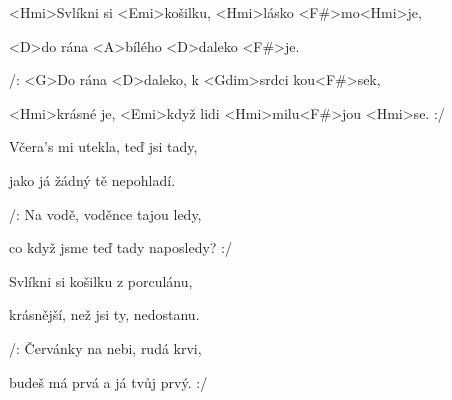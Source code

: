 

\zs
<Hmi>Svlíkni si <Emi>košilku, <Hmi>lásko <F#>mo<Hmi>je,

<D>do rána <A>bílého <D>daleko <F#>je.

/: <G>Do rána <D>daleko, k <Gdim>srdci kou<F#>sek,

<Hmi>krásné je, <Emi>když lidi <Hmi>milu<F#>jou <Hmi>se. :/
\ks

\zs
Včera's mi utekla, teď jsi tady,

jako já žádný tě nepohladí.

/: Na vodě, voděnce tajou ledy,

co když jsme teď tady naposledy? :/
\ks

\zs
Svlíkni si košilku z porculánu,

krásnější, než jsi ty, nedostanu.

/: Červánky na nebi, rudá krvi,

budeš má prvá a já tvůj prvý. :/
\ks

\kp

